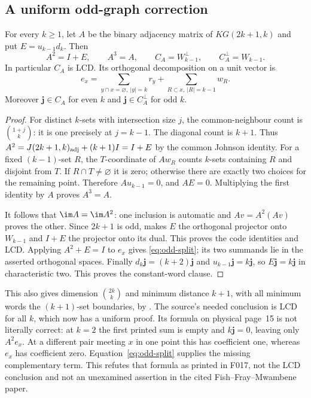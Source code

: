 \subsection{A uniform odd-graph correction}
\begin{proposition}\label{prop:odd-graph}
For every $k\geq1$, let $A$ be the binary adjacency matrix of
$KG(2k+1,k)$ and put $E=u_{k-1}d_k$. Then
\[
 A^2=I+E,\qquad A^3=A,\qquad
 C_A=W_{k-1}^\perp,\qquad C_A^\perp=W_{k-1}.
\]
In particular $C_A$ is LCD. Its orthogonal decomposition on a unit
vector is
\begin{equation}\label{eq:odd-split}
 e_x=\sum_{y\cap x=\varnothing,\ |y|=k}r_y
          +\sum_{R\subset x,\ |R|=k-1}w_R.
\end{equation}
Moreover $\mathbf j\in C_A$ for even $k$ and
$\mathbf j\in C_A^\perp$ for odd $k$.
\end{proposition}
\begin{proof}
For distinct $k$-sets with intersection size $j$, the common-neighbour
count is $\binom{1+j}{k}$: it is one precisely at $j=k-1$.
The diagonal count is $k+1$. Thus
$A^2=J(2k+1,k)_{\rm adj}+(k+1)I=I+E$ by the common Johnson identity.
For a fixed $(k-1)$-set $R$, the $T$-coordinate of $Aw_R$ counts
$k$-sets containing $R$ and disjoint from $T$. If $R\cap T\ne\varnothing$
it is zero; otherwise there are exactly two choices for the remaining
point. Therefore $Au_{k-1}=0$, and $AE=0$. Multiplying the first
identity by $A$ proves $A^3=A$.

It follows that $\im A=\im A^2$: one inclusion is automatic and
$Av=A^2(Av)$ proves the other. Since $2k+1$ is odd,
 makes $E$ the orthogonal projector onto
$W_{k-1}$ and $I+E$ the projector onto its dual. This proves the
code identities and LCD. Applying $A^2+E=I$ to $e_x$ gives
\eqref{eq:odd-split}; its two summands lie in the asserted orthogonal
spaces. Finally $d_k\mathbf j=(k+2)\mathbf j$ and
$u_{k-1}\mathbf j=k\mathbf j$, so $E\mathbf j=k\mathbf j$ in
characteristic two. This proves the constant-word clause.
\end{proof}
This also gives dimension $\binom{2k}{k}$ and minimum distance $k+1$,
with all minimum words the $(k+1)$-set boundaries, by
. The source's needed conclusion is LCD for all
$k$, which now has a uniform proof.
Its formula on physical page~15 is not literally correct: at $k=2$
the first printed sum is empty and $k\mathbf j=0$, leaving only
$A^2e_x$. At a different pair meeting $x$ in one point this has
coefficient one, whereas $e_x$ has coefficient zero.
Equation~\eqref{eq:odd-split} supplies the missing complementary term.
This refutes that formula as printed in F017, not the LCD conclusion
and not an unexamined assertion in the cited Fish--Fray--Mwambene paper.


